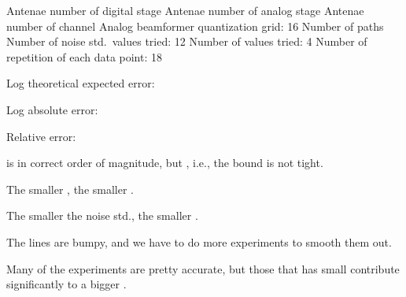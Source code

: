 
{
\I Antenae number of digital stage 
\I Antenae number of analog stage 
\I Antenae number of channel 
\I Analog beamformer quantization grid: 16
\I Number of paths 
\I Number of noise std.\ values tried: 12
\I Number of \m {\g} values tried: 4
\I Number of repetition of each data point: 18
}
{
\I Log theoretical expected error:

\I Log absolute error:

\I Relative error:
}
{
\blank [big]
}
{
\blank [big]
}
{

\I {} is in correct order of magnitude, but , i.e., the bound is not tight.

\I The smaller \m {\g}, the smaller .

\I The smaller the noise std., the smaller .

\I The lines are bumpy, and we have to do more experiments to smooth them out.

\I Many of the experiments are pretty accurate, but those that has small  contribute significantly to a bigger .
}

